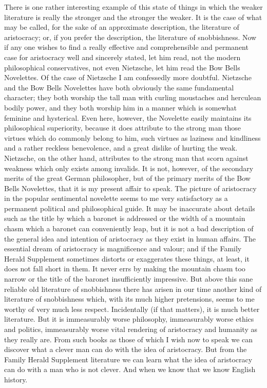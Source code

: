 There is one rather interesting example of this state of things in which the weaker literature is really the stronger and the stronger the weaker. It is the case of what may be called, for the sake of an approximate description, the literature of aristocracy; or, if you prefer the description, the literature of snobbishness. Now if any one wishes to find a really effective and comprehensible and permanent case for aristocracy well and sincerely stated, let him read, not the modern philosophical conservatives, not even Nietzsche, let him read the Bow Bells Novelettes. Of the case of Nietzsche I am confessedly more doubtful. Nietzsche and the Bow Bells Novelettes have both obviously the same fundamental character; they both worship the tall man with curling moustaches and herculean bodily power, and they both worship him in a manner which is somewhat feminine and hysterical. Even here, however, the Novelette easily maintains its philosophical superiority, because it does attribute to the strong man those virtues which do commonly belong to him, such virtues as laziness and kindliness and a rather reckless benevolence, and a great dislike of hurting the weak. Nietzsche, on the other hand, attributes to the strong man that scorn against weakness which only exists among invalids. It is not, however, of the secondary merits of the great German philosopher, but of the primary merits of the Bow Bells Novelettes, that it is my present affair to speak. The picture of aristocracy in the popular sentimental novelette seems to me very satisfactory as a permanent political and philosophical guide. It may be inaccurate about details such as the title by which a baronet is addressed or the width of a mountain chasm which a baronet can conveniently leap, but it is not a bad description of the general idea and intention of aristocracy as they exist in human affairs. The essential dream of aristocracy is magnificence and valour; and if the Family Herald Supplement sometimes distorts or exaggerates these things, at least, it does not fall short in them. It never errs by making the mountain chasm too narrow or the title of the baronet insufficiently impressive. But above this sane reliable old literature of snobbishness there has arisen in our time another kind of literature of snobbishness which, with its much higher pretensions, seems to me worthy of very much less respect. Incidentally (if that matters), it is much better literature. But it is immeasurably worse philosophy, immeasurably worse ethics and politics, immeasurably worse vital rendering of aristocracy and humanity as they really are. From such books as those of which I wish now to speak we can discover what a clever man can do with the idea of aristocracy. But from the Family Herald Supplement literature we can learn what the idea of aristocracy can do with a man who is not clever. And when we know that we know English history.

